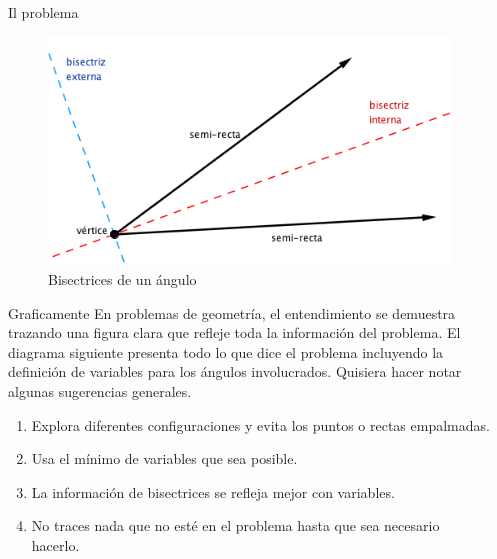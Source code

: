 \documentclass[final]{beamer}
\newlength{\onecolwid}
\begin{document}
\begin{frame}[t]
\begin{columns}[t]
\begin{column}{\onecolwid}
\begin{block}{Il problema}
\end{block}


\begin{figure}
\includegraphics[width=0.8\linewidth]{bisectriz.png}
\caption{Bisectrices de un ángulo}
\end{figure}

\begin{block}{Graficamente}
En problemas de geometría, el entendimiento se demuestra trazando una figura clara que refleje toda la información del problema.
El diagrama siguiente presenta todo lo que dice el problema incluyendo la definición de variables para los ángulos involucrados. Quisiera hacer notar algunas sugerencias generales.

\begin{enumerate}
\item Explora diferentes configuraciones y evita los puntos o rectas empalmadas.
\item Usa el mínimo de variables que sea posible.
\item La información de bisectrices se refleja mejor con variables.  
\item No traces nada que no esté en el problema hasta que sea necesario hacerlo.
\end{enumerate}


\end{block}


\end{column} %

\begin{column}{\onecolwid} 


\end{column}
\end{columns}
\end{frame}
\end{document}
